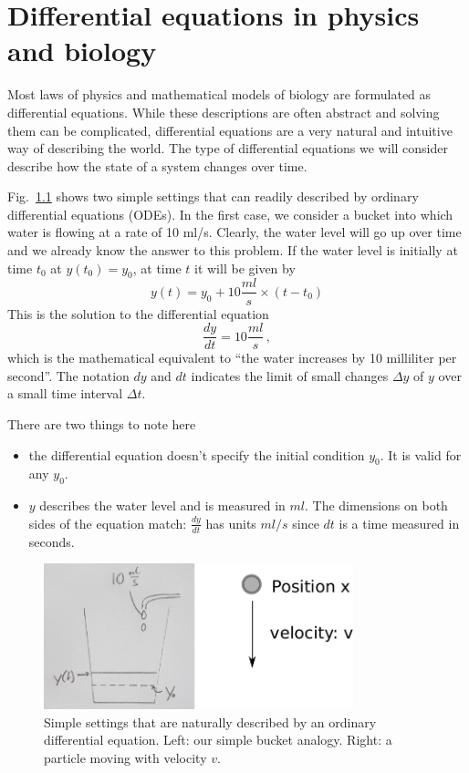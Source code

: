 \chapter{Differential equations in physics and biology}

Most laws of physics and mathematical models of biology are formulated as differential equations.
While these descriptions are often abstract and solving them can be complicated, differential equations are a very natural and intuitive way of describing the world.
The type of differential equations we will consider describe how the state of a system changes over time.

Fig.~\ref{fig:ode} shows two simple settings that can readily described by ordinary differential equations (ODEs).
In the first case, we consider a bucket into which water is flowing at a rate of 10 ml/s.
Clearly, the water level will go up over time and we already know the answer to this problem.
If the water level is initially at time $t_0$ at $y(t_0)=y_0$, at time $t$ it will be given by
\begin{equation}
y(t) = y_0 + 10\frac{ml}{s}\times (t - t_0)
\end{equation}
This is the solution to the differential equation
\begin{equation}
    \frac{dy}{dt} = 10\frac{ml}{s} \, ,
\end{equation}
which is the mathematical equivalent to ``the water increases by 10 milliliter per second''.
The notation $dy$ and $dt$ indicates the limit of small changes $\Delta y$ of $y$ over a small time interval $\Delta t$.

There are two things to note here
\begin{itemize}
    \item the differential equation doesn't specify the initial condition $y_0$. It is valid for any $y_0$.
    \item $y$ describes the water level and is measured in $ml$. The dimensions on both sides of the equation match: $\frac{dy}{dt}$ has units $ml/s$ since $dt$ is a time measured in seconds.
\end{itemize}

\begin{figure}[tb]
    \includegraphics[width=0.8\textwidth]{figures/ODE.pdf}
    \caption{\label{fig:ode} Simple settings that are naturally described by an ordinary differential equation. Left: our simple bucket analogy. Right: a particle moving with velocity $v$.}
\end{figure}

